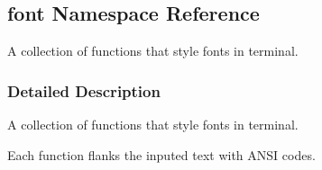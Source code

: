 \hypertarget{namespacefont}{}\subsection{font Namespace Reference}
\label{namespacefont}


A collection of functions that style fonts in terminal.  




\subsubsection{Detailed Description}
A collection of functions that style fonts in terminal. 

Each function flanks the inputed text with A\+N\+SI codes. 